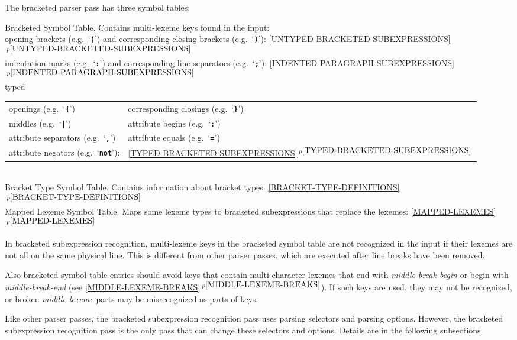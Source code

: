 \documentclass[12pt]{article}
\newcommand{\TT}[1]{{\tt \bfseries #1}}
\newcommand{\itemref}[1]{\ref{#1}$\,^{p\pageref{#1}}$}
\newenvironment{indpar}[1][0.3in]%
	{\begin{list}{}%
		     {\setlength{\itemsep}{0in}%
		      \setlength{\topsep}{0in}%
		      \setlength{\parsep}{1ex}%
		      \setlength{\labelwidth}{#1}%
		      \setlength{\leftmargin}{#1}%
		      \addtolength{\leftmargin}{\labelsep}}%
	 \item}%
	{\end{list}}
\begin{document}
The bracketed parser pass has three symbol tables:
\begin{indpar}[0.3in]
Bracketed Symbol Table.\label{BRACKETED-SYMBOL-TABLE}
Contains multi-lexeme keys found in
the input: \\
\hspace*{0.2in}opening brackets (e.g.~`\TT{(}') and
    corresponding closing brackets (e.g.~`\TT{)}'):
    \itemref{UNTYPED-BRACKETED-SUBEXPRESSIONS}
\\[0.5ex]
\hspace*{0.2in}indentation marks (e.g.~`\TT{:}')
    and corresponding line separators (e.g.~`\TT{;}'):
    \itemref{INDENTED-PARAGRAPH-SUBEXPRESSIONS}
\\[0.5ex]
\hspace*{0.2in}typed
      \begin{tabular}[t]{@{}ll}
      openings (e.g.~`\TT{\{}') &
      corresponding closings (e.g.~`\TT{\}}') \\
      middles (e.g.~`\TT{|}') &
      attribute begins (e.g.~`\TT{:}') \\
      attribute separators (e.g.~`\TT{,}') &
      attribute equals (e.g.~`\TT{=}') \\
      attribute negators (e.g.~`\TT{not}'): &
      \itemref{TYPED-BRACKETED-SUBEXPRESSIONS}
      \end{tabular}
\\[1ex]
Bracket Type Symbol Table. Contains information about bracket types:
\itemref{BRACKET-TYPE-DEFINITIONS}
\\[1ex]
Mapped Lexeme Symbol Table.  Maps some lexeme types to
bracketed subexpressions that replace the lexemes: \itemref{MAPPED-LEXEMES}
\end{indpar}

In bracketed subexpression recognition, 
multi-lexeme keys in the bracketed symbol table
are not recognized in the
input if their lexemes are not all on the same physical line.
This is different from other parser passes, which are executed
after line breaks have been removed.

Also bracketed symbol table entries should avoid keys
that contain multi-character lexemes that end with {\em middle-break-begin}
or begin with {\em middle-break-end} (see \itemref{MIDDLE-LEXEME-BREAKS}).
If such keys are used, they may
not be recognized, or broken {\em middle-lexeme} parts may be misrecognized
as parts of keys.

Like other parser passes, the bracketed subexpression recognition pass uses
parsing selectors and parsing options.
However, the bracketed subexpression recognition pass
is the only pass that can change these selectors and options.  Details are in
the following subsections.
\end{document}

